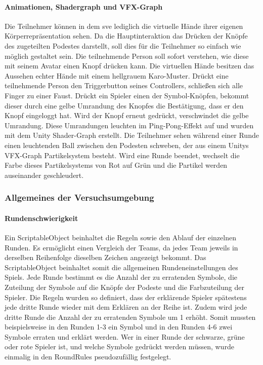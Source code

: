 \documentclass[a4paper,11pt]{article}%
\renewcommand{\\}{\vspace*{0.5\baselineskip} \newline}
\begin{document}
\paragraph{Animationen, Shadergraph und VFX-Graph}
Die Teilnehmer können in dem \ac{sve} lediglich die virtuelle Hände ihrer eigenen Körperrepräsentation sehen. Da die Hauptinteraktion das Drücken der Knöpfe des zugeteilten Podestes darstellt, soll dies für die Teilnehmer so einfach wie möglich gestaltet sein. Die teilnehmende Person soll sofort verstehen, wie diese mit seinem Avatar einen Knopf drücken kann. Die virtuellen Hände besitzen das Aussehen echter Hände mit einem hellgrauem Karo-Muster. Drückt eine teilnehmende Person den Triggerbutton seines Controllers, schließen sich alle Finger zu einer Faust.
Drückt ein Spieler einen der Symbol-Knöpfen, bekommt dieser durch eine gelbe Umrandung des Knopfes die Bestätigung, dass er den Knopf eingeloggt hat. Wird der Knopf erneut gedrückt, verschwindet die gelbe Umrandung. Diese Umrandungen leuchten im Ping-Pong-Effekt auf und wurden mit dem Unity Shader-Graph erstellt.
Die Teilnehmer sehen während einer Runde einen leuchtenden Ball zwischen den Podesten schweben, der aus einem Unitys VFX-Graph Partikelsystem besteht. Wird eine Runde beendet, wechselt die Farbe dieses Partikelsystems von Rot auf Grün und die Partikel werden auseinander geschleudert. 

\subsubsection{Allgemeines der Versuchsumgebung}

\paragraph{Rundenschwierigkeit}
Ein ScriptableObject beinhaltet die Regeln sowie den Ablauf der einzelnen Runden. Es ermöglicht einen Vergleich der Teams, da jedes Team jeweils in derselben Reihenfolge dieselben Zeichen angezeigt bekommt. Das ScriptableObject beinhaltet somit die allgemeinen Rundeneinstellungen des Spiels. Jede Runde bestimmt es die Anzahl der zu erratenden Symbole, die Zuteilung der Symbole auf die Knöpfe der Podeste und die Farbzuteilung der Spieler. Die Regeln wurden so definiert, dass der erklärende Spieler spätestens jede dritte Runde wieder mit dem Erklären an der Reihe ist. Zudem wird jede dritte Runde die Anzahl der zu erratenden Symbole um 1 erhöht. Somit mussten beispielsweise in den Runden 1-3 ein Symbol und in den Runden 4-6 zwei Symbole erraten und erklärt werden. Wer in einer Runde der schwarze, grüne oder rote Spieler ist, und welche Symbole gedrückt werden müssen, wurde einmalig in den RoundRules pseudozufällig festgelegt.
\end{document}

